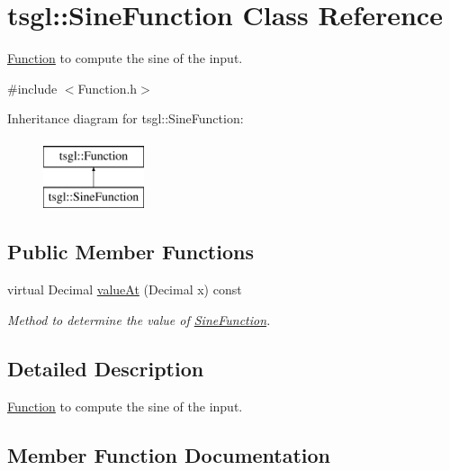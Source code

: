 \hypertarget{classtsgl_1_1_sine_function}{}\section{tsgl\+:\+:Sine\+Function Class Reference}
\label{classtsgl_1_1_sine_function}


\hyperlink{classtsgl_1_1_function}{Function} to compute the sine of the input.  




{\ttfamily \#include $<$Function.\+h$>$}

Inheritance diagram for tsgl\+:\+:Sine\+Function\+:\begin{figure}[H]
\begin{center}
\leavevmode
\includegraphics[height=2.000000cm]{classtsgl_1_1_sine_function}
\end{center}
\end{figure}
\subsection*{Public Member Functions}
\begin{DoxyCompactItemize}
\item 
virtual Decimal \hyperlink{classtsgl_1_1_sine_function_a6507b049141d946ede1611050e44dab2}{value\+At} (Decimal x) const 
\begin{DoxyCompactList}\small\item\em Method to determine the value of \hyperlink{classtsgl_1_1_sine_function}{Sine\+Function}. \end{DoxyCompactList}\end{DoxyCompactItemize}


\subsection{Detailed Description}
\hyperlink{classtsgl_1_1_function}{Function} to compute the sine of the input. 

\subsection{Member Function Documentation}
\hypertarget{classtsgl_1_1_sine_function_a6507b049141d946ede1611050e44dab2}{}

